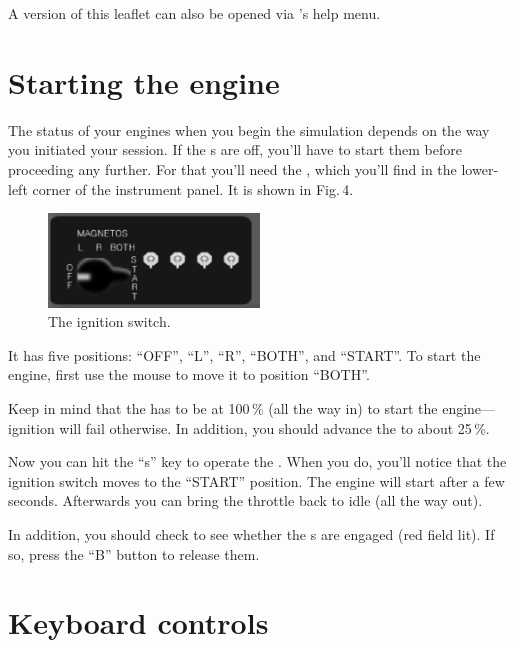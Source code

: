\noindent
A version of this leaflet can also be opened via \FlightGear{}'s help menu.

\section{Starting the engine}

The status of your engines when you begin the simulation depends on the way you initiated your session.  If the s are off, you'll have to start them before proceeding any further.  For that you'll need the , which you'll find in the lower-left corner of the instrument panel. It is shown in Fig.\,4.

\begin{figure}[!htp]
\centering
\includegraphics[width=0.5\textwidth]{magnet2}
\caption{The ignition switch.}
\end{figure}

It has five positions: ``OFF'', ``L'', ``R'', ``BOTH'', and ``START''.
 To start the
engine, first use the mouse to move it to position ``BOTH''.

Keep in mind that the  has to be at 100\,\% (all
the way in) to start the engine---ignition will fail otherwise. In
addition, you should advance the  to about 25\,\%.

Now you can hit the ``s'' key to operate the . When you do, you'll notice that the ignition switch moves to the ``START'' position.  The engine will start after a few seconds.
Afterwards you can bring the throttle back to idle (all the way out).

In addition, you should check to see whether the s are engaged (red
field lit). If so, press the ``B'' button to release them.

\section{Keyboard controls}

